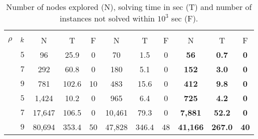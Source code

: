 \setlength{\tabcolsep}{6pt}

\begin{table}[!ht]
	\small
	\centering
    \begin{tabular}{cc||c|c|c||c|c|c||c|c|c}
	\toprule
	& & \multicolumn{3}{c||}{\CPLEX{}} & \multicolumn{3}{c||}{\BNB{}} & \multicolumn{3}{c}{\BNBscr{}} \\
	$\rho$ & \(k\) & \multicolumn{1}{c}{N} & \multicolumn{1}{c}{T} & \multicolumn{1}{c||}{F} & \multicolumn{1}{c}{N} & \multicolumn{1}{c}{T} & \multicolumn{1}{c||}{F} & \multicolumn{1}{c}{N} & \multicolumn{1}{c}{T} & \multicolumn{1}{c}{F} \\ \midrule\midrule
    & \(5\) & 96 & 25.9 & 0 & 70 & 1.5 & 0 & \textbf{56} & \textbf{0.7} & \textbf{0} \\
    & \(7\) & 292 & 60.8 & 0 & 180 & 5.1 & 0 & \textbf{152} & \textbf{3.0} & \textbf{0} \\ 
    \parbox[t]{8mm}{} & \(9\) & 781 & 102.6 & 10 & 483 & 15.6 & 0 & \textbf{412} & \textbf{9.8} & \textbf{0} \\ \midrule
	& \(5\) & 1,424 & 10.2 & 0 & 965 & 6.4 & 0 & \textbf{725} & \textbf{4.2} & \textbf{0} \\
    & \(7\) & 17,647 & 106.5 & 0 & 10,461 & 79.3 & 0 & \textbf{7,881} & \textbf{52.2} & \textbf{0} \\ 
    \parbox[t]{8mm}{} & \(9\) & 80,694 & 353.4 & 50 & 47,828 & 346.4 & 48 & \textbf{41,166} & \textbf{267.0} & \textbf{40} \\ \bottomrule                      
    \end{tabular}
	\caption{
		\small
		\label{tab:figure}
		Number of nodes explored (N), solving time in sec (T) and number of instances not solved within $10^3$ sec (F).
	}
\end{table}
